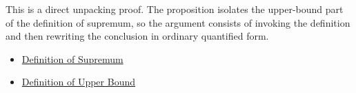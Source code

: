 \begin{remark*}
This is a direct unpacking proof. The proposition isolates the upper-bound part of the definition of supremum, so the argument consists of invoking the definition and then rewriting the conclusion in ordinary quantified form.
\end{remark*}

\begin{remark*}[Dependencies]\hfill
\begin{itemize}
  \item \hyperref[def:supremum]{Definition of Supremum}
  \item \hyperref[def:upper-bound]{Definition of Upper Bound}
\end{itemize}
\end{remark*}
